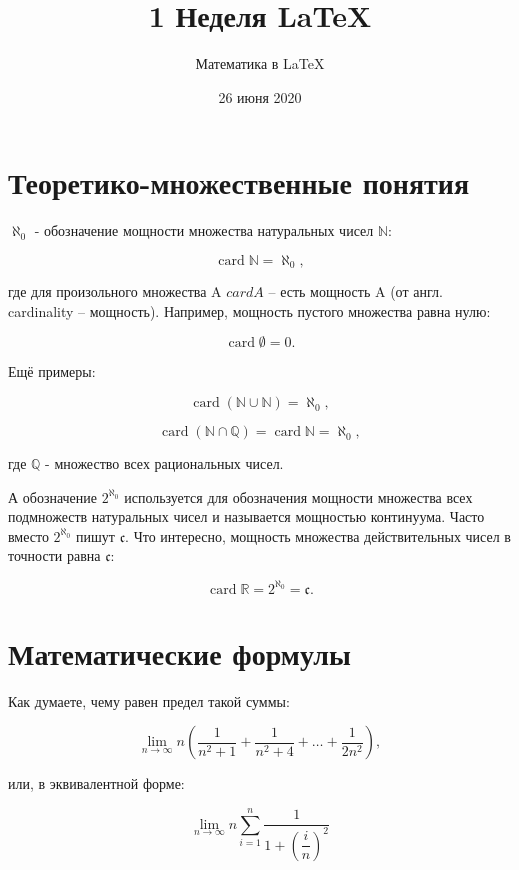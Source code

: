 \documentclass[a4paper,12pt]{article}
\author{Математика в \LaTeX{}}
\title{1 Неделя \LaTeX{}}
\date{26 июня 2020}
\DeclareMathOperator{\card}{\mathop{card}} %
\begin{document}

\maketitle



\section{Теоретико-множественные понятия}\label{sets}

$\aleph_{0}$ - обозначение мощности множества натуральных чисел $\mathbb{N}$:

\[ 
\card{\mathbb{N}} = \aleph_{0},
\]

где для произольного множества A $card{A}$ -- есть мощность A (от англ. cardinality -- мощность). Например, мощность пустого множества равна нулю:

\[ 
\card{\emptyset} = 0.
\]

Ещё примеры:

\[ 
\card{(\mathbb{N} \cup \mathbb{N})} = \aleph_{0},
\]

\[ 
\card{(\mathbb{N} \cap \mathbb{Q})} = \card{\mathbb{N}} = \aleph_{0},
\]

где $\mathbb{Q}$ - множество всех рациональных чисел.

А обозначение $2^{\aleph_{0}}$ используется для обозначения мощности множества всех подмножеств натуральных чисел и называется мощностью континуума. Часто вместо $2^{\aleph_{0}}$ пишут $\mathfrak{c}$. 
Что интересно, мощность множества действительных чисел в точности равна $\mathfrak{c}$:

\[
\card{\mathbb{R}} = 2^{\aleph_{0}} = \mathfrak{c}.
\]



\section{Математические формулы}\label{math_formulas}

Как думаете, чему равен предел такой суммы:

\begin{equation}\label{eq:lim_sum_pi_4}
	\lim_{n\to\infty} 
		n \left(\frac{1}{n^2 + 1} + \frac{1}{n^2 + 4} + \dots + \frac{1}{2n^2}
						\right),
\end{equation}

или, в эквивалентной форме:

\[ 
	\lim_{n\to\infty} n \sum_{i=1}^n \frac{1}{1+\left(\dfrac{i}{n}\right)^2}
\]
\end{document}
